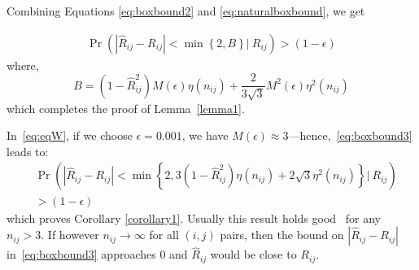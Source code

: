 Combining Equations \eqref{eq:boxbound2} and \eqref{eq:naturalboxbound}, we get 

\begin{equation}\label{eq:boxbound3}
\begin{aligned}
    \Pr \left (  | \hat{R}_{ij} - R_{ij} | < \min \left \{ 2, B\right \} \bigg |~R_{ij} \right ) 
    > (1 - \epsilon) 
\end{aligned}
\end{equation}
where, 
$$B = (1 - \hat{R}^2_{ij})M(\epsilon)\eta (n_{ij}) + \frac{2}{3\sqrt{3}} M^2(\epsilon)\eta^2 (n_{ij})$$
which completes the proof of Lemma~\ref{lemma1}.

In~\eqref{eq:eqW}, if we choose $\epsilon = 0.001$, we have $M(\epsilon) \approx 3$---hence,~\eqref{eq:boxbound3} leads to:
\begin{align}
    & \Pr \left (  | \hat{R}_{ij} - R_{ij} | < \min \left \{ 2, 3 (1 - \hat{R}^2_{ij})\eta(n_{ij}) + 2 \sqrt{3}\eta^2(n_{ij}) \right \} \bigg |~ R_{ij} \right )  \nonumber \\
    &> (1 - \epsilon)~~~~~~~~~~~ \label{eq:boxbound4}
    \end{align}
which proves Corollary \ref{corollary1}. Usually this result holds good~\cite{fisher1921} for any $n_{ij} > 3$. If however $n_{ij} \rightarrow \infty$ for all $(i,j)$ pairs, then the bound on $| \hat{R}_{ij} - R_{ij} |$ in~\eqref{eq:boxbound3} approaches 0 and $\hat{R}_{ij}$ would be close to $R_{ij}$.



\begin{comment}
\subsection*{Robocov correlation estimator using slack variables}

We propose a slightly more flexible alternative to \Robocov{} correlation estimator using slack variables. In practice, however, we have not observed performance gains using this slack-ier version. The optimization problem in this case is of the following form. 

\begin{equation*}\label{eq:robocov_slack}
 \begin{aligned}
    & \text{min} 
    &&  \sum_{i<j} \mathcal{L}(R_{ij}) + \tau \sum_{i < j} |\alpha_{ij} | \\
    & \text{where} 
    && \Sigma \geq 0 \\
    &&& | \hat{R}_{ij} - R_{ij} |  \leq  C^{\star}_{ij} + \alpha_{ij} ~~~ \forall i,j = 1, 2, \cdots, P  \\
    &&& C^{\star}_{ij} = min \left (2,  \eta (n_{ij}) \left \{ 3 (1 - \hat{R}^2_{ij}) + 2 \sqrt{3} \eta^2 (n_{ij}) \right \} \right ) \\
    &&& \hat{R}_{ij}= \text{pairwise sample correlation} \\
    &&& \eta(n_{ij}) = \sqrt{\frac{1}{n_{ij} - 1} + \frac{2}{(n_{ij} - 1)^2}} \\\
 \end{aligned}
\end{equation*}
\end{comment}


